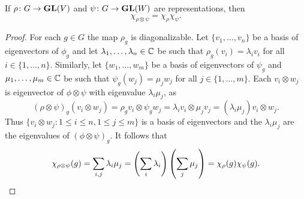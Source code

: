 \begin{proposition}
  	If $\rho\colon G\to\mathbf{GL}(V)$ and
    $\psi\colon G\to\mathbf{GL}(W)$ are representations, then
    \[
    \chi_{\rho\otimes\psi}=\chi_\rho\chi_\psi.
    \]
\end{proposition}

\begin{proof}
	For each $g\in G$ the map $\rho_g$ is diagonalizable. Let $\{v_1,\dots,v_n\}$
	be a basis of eigenvectors of $\phi_g$ and let $\lambda_1,\dots,\lambda_n\in\mathbb{C}$ be such that
	$\rho_g(v_i)=\lambda_iv_i$ for all $i\in\{1,\dots,n\}$. Similarly, 
	let $\{w_1,\dots,w_m\}$ be a basis of 
	eigenvectors of $\psi_g$ and $\mu_1,\dots,\mu_m\in\mathbb{C}$ be such that $\psi_g(w_j)=\mu_jw_j$ for all $j\in\{1,\dots,m\}$. Each 
	$v_i\otimes w_j$ is eigenvector of $\phi\otimes\psi$ with eigenvalue 
	$\lambda_i\mu_j$, as  
	\[
		(\rho\otimes\psi)_g(v_i\otimes w_j)=\rho_gv_i\otimes \psi_gw_j=\lambda_iv_i\otimes \mu_jv_j=(\lambda_i\mu_j)v_i\otimes w_j.
	\]
	Thus  
	$\{v_i\otimes w_j:1\leq i\leq n,1\leq j\leq m\}$ is a basis of eigenvectors and the 
	$\lambda_i\mu_j$ are the eigenvalues of $(\phi\otimes\psi)_g$. It follows that 
	\[
	\chi_{\rho\otimes\psi}(g)
	=\sum_{i,j}\lambda_i\mu_j
	=\left(\sum_i\lambda_i\right)\left(\sum_j\mu_j\right)
	=\chi_\rho(g)\chi_\psi(g).\qedhere 
	\]
\end{proof}

